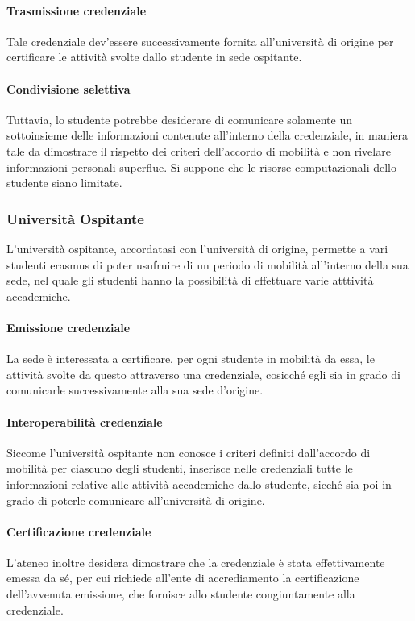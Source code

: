 \documentclass[a4paper,12pt]{article}
\begin{document}
\paragraph{Trasmissione credenziale}Tale credenziale dev'essere successivamente fornita all'università di origine per certificare le attività svolte dallo studente in sede ospitante. 
\paragraph{Condivisione selettiva} Tuttavia, lo studente potrebbe desiderare di comunicare solamente un sottoinsieme delle informazioni contenute all'interno della credenziale, in maniera tale da dimostrare il rispetto dei criteri dell'accordo di mobilità e non rivelare informazioni personali superflue.
\newline Si suppone che le risorse computazionali dello studente siano limitate. 

\subsubsection{Università Ospitante}
L'università ospitante, accordatasi con l'università di origine, permette a vari studenti erasmus di poter usufruire di un periodo di mobilità all'interno della sua sede, nel quale gli studenti hanno la possibilità di effettuare varie atttività accademiche.
\paragraph{Emissione credenziale} La sede è interessata a certificare, per ogni studente in mobilità da essa, le attività svolte da questo attraverso una credenziale, cosicché egli sia in grado di comunicarle successivamente alla sua sede d'origine.
\paragraph{Interoperabilità credenziale} Siccome l'università ospitante non conosce i criteri definiti dall'accordo di mobilità per ciascuno degli studenti, inserisce nelle credenziali tutte le informazioni relative alle attività accademiche dallo studente, sicché sia poi in grado di poterle comunicare all'università di origine.
\paragraph{Certificazione credenziale}  L'ateneo inoltre desidera dimostrare che la credenziale è stata effettivamente emessa da sé, per cui richiede all'ente di accrediamento la certificazione dell'avvenuta emissione, che fornisce allo studente congiuntamente alla credenziale.
\end{document}
